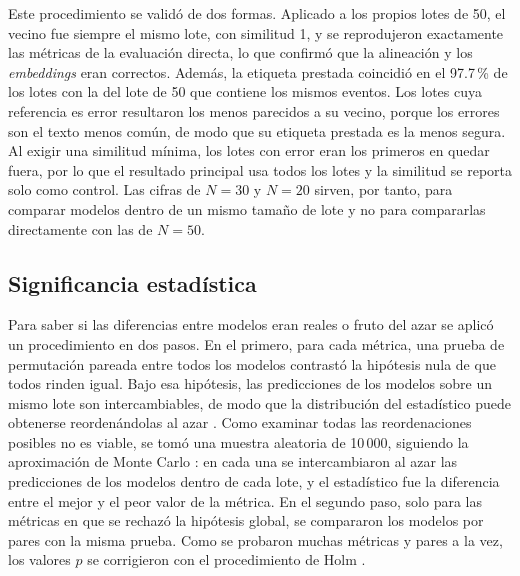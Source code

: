 Este procedimiento se validó de dos formas. Aplicado a los propios lotes de 50, el vecino fue siempre el mismo lote, con similitud 1, y se reprodujeron exactamente las métricas de la evaluación directa, lo que confirmó que la alineación y los \textit{embeddings} eran correctos. Además, la etiqueta prestada coincidió en el 97.7\,\% de los lotes con la del lote de 50 que contiene los mismos eventos. Los lotes cuya referencia es error resultaron los menos parecidos a su vecino, porque los errores son el texto menos común, de modo que su etiqueta prestada es la menos segura. Al exigir una similitud mínima, los lotes con error eran los primeros en quedar fuera, por lo que el resultado principal usa todos los lotes y la similitud se reporta solo como control. Las cifras de $N = 30$ y $N = 20$ sirven, por tanto, para comparar modelos dentro de un mismo tamaño de lote y no para compararlas directamente con las de $N = 50$.

\subsection{Significancia estadística}\label{subsec:met_significancia}

Para saber si las diferencias entre modelos eran reales o fruto del azar se aplicó un procedimiento en dos pasos. En el primero, para cada métrica, una prueba de permutación pareada entre todos los modelos contrastó la hipótesis nula de que todos rinden igual. Bajo esa hipótesis, las predicciones de los modelos sobre un mismo lote son intercambiables, de modo que la distribución del estadístico puede obtenerse reordenándolas al azar \cite{good2005_permutation}. Como examinar todas las reordenaciones posibles no es viable, se tomó una muestra aleatoria de 10\,000, siguiendo la aproximación de Monte Carlo \cite{good2005_permutation}: en cada una se intercambiaron al azar las predicciones de los modelos dentro de cada lote, y el estadístico fue la diferencia entre el mejor y el peor valor de la métrica. En el segundo paso, solo para las métricas en que se rechazó la hipótesis global, se compararon los modelos por pares con la misma prueba. Como se probaron muchas métricas y pares a la vez, los valores $p$ se corrigieron con el procedimiento de Holm \cite{holm1979_sequential}.


